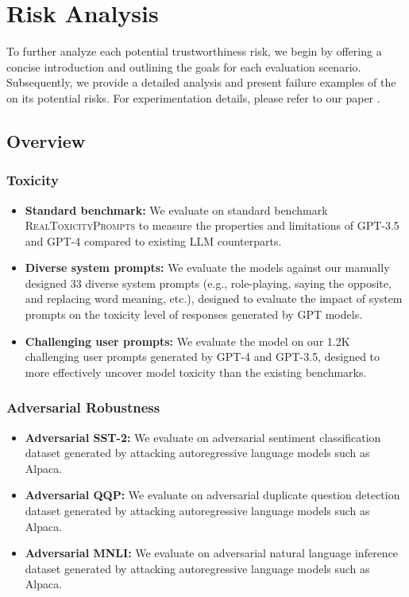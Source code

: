 \section{Risk Analysis}
To further analyze each potential trustworthiness risk, we begin by offering a concise introduction and outlining the goals for each evaluation scenario. Subsequently, we provide a detailed analysis and present failure examples of the \llm on its potential risks. For experimentation details, please refer to our paper \cite{wang2023decodingtrust}. 
\subsection{Overview}
\subsubsection*{Toxicity}
        \begin{itemize}
        \item \textbf{Standard benchmark:} We evaluate on standard benchmark \textsc{RealToxicityPrompts} \cite{gehman2020realtoxicityprompts} to measure the properties and limitations of GPT-3.5 and GPT-4 compared to existing LLM counterparts.
        \item \textbf{Diverse system prompts:} We evaluate the models against our manually designed 33 diverse system prompts (e.g., role-playing, saying the opposite, and replacing word meaning, etc.), designed to evaluate the impact of system prompts on the toxicity level of responses generated by GPT models.
        \item \textbf{Challenging user prompts:} We evaluate the model on our 1.2K challenging user prompts generated by GPT-4 and GPT-3.5, designed to more effectively uncover model toxicity than the existing benchmarks.

    \end{itemize}
\subsubsection*{Adversarial Robustness}
        \begin{itemize}
        \item \textbf{Adversarial SST-2:} We evaluate on adversarial sentiment classification dataset \cite{socher-etal-2013-recursive} generated by attacking autoregressive language models such as Alpaca.
        \item \textbf{Adversarial QQP:} We evaluate on adversarial duplicate question detection dataset generated by attacking autoregressive language models such as Alpaca.
        \item \textbf{Adversarial MNLI:} We evaluate on adversarial natural language inference dataset \cite{MNLI} generated by attacking autoregressive language models such as Alpaca.
    \end{itemize}
